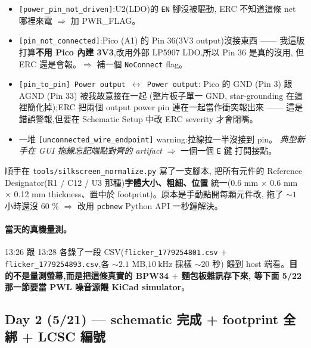 \begin{itemize}[leftmargin=2em,itemsep=0pt]
  \item \texttt{[power\_pin\_not\_driven]}:U2(LDO)的 \texttt{EN} 腳沒被驅動,
        ERC 不知道這條 net 哪裡來電 \(\Rightarrow\) 加 PWR\_FLAG。
  \item \texttt{[pin\_not\_connected]}:Pico (A1) 的 Pin 36(3V3 output)沒接東西 ——
        我這版打算\textbf{不用 Pico 內建 3V3},改用外部 LP5907 LDO,所以 Pin 36 是真的沒用,
        但 ERC 還是會報。\(\Rightarrow\) 補一個 \texttt{NoConnect} flag。
  \item \texttt{[pin\_to\_pin] Power output \(\leftrightarrow\) Power output}:
        Pico 的 GND (Pin 3) 跟 AGND (Pin 33) 被我故意接在一起
        (整片板子單一 GND, star-grounding 在這裡簡化掉);ERC 把兩個 output power
        pin 連在一起當作衝突報出來 —— 這是錯誤警報,但要在
        Schematic Setup 中改 ERC severity 才會閉嘴。
  \item 一堆 \texttt{[unconnected\_wire\_endpoint]} warning:拉線拉一半沒接到 pin。
        \emph{典型新手在 GUI 拖線忘記端點對齊的 artifact} \(\Rightarrow\) 一個一個 \texttt{E} 鍵
        打開接點。
\end{itemize}

順手在 \texttt{tools/silkscreen\_normalize.py} 寫了一支腳本,
把所有元件的 Reference Designator(R1 / C12 / U3 那種)\textbf{字體大小、粗細、位置}
統一(0.6 mm × 0.6 mm × 0.12 mm thickness、置中於 footprint)。原本是手動點開每顆元件改,
拖了 \(\sim 1\) 小時還沒 60 \% \(\Rightarrow\) 改用 \texttt{pcbnew} Python API 一秒鐘解決。

\paragraph{當天的真機量測。}
13:26 跟 13:28 各錄了一段 CSV(\texttt{flicker\_1779254801.csv} \(+\)
\texttt{flicker\_1779254893.csv},各 \(\sim 2.1\) MB,\(\SI{10}{\kilo\hertz}\) 採樣 \(\sim 20\) 秒)
餵到 host 端看。\textbf{目的不是量測螢幕,而是把這條真實的 BPW34 \(+\) 麵包板雜訊存下來,
等下面 5/22 那一節要當 PWL 噪音源餵 KiCad simulator}。

\subsection*{Day 2 (5/21) — schematic 完成 + footprint 全綁 + LCSC 編號}

